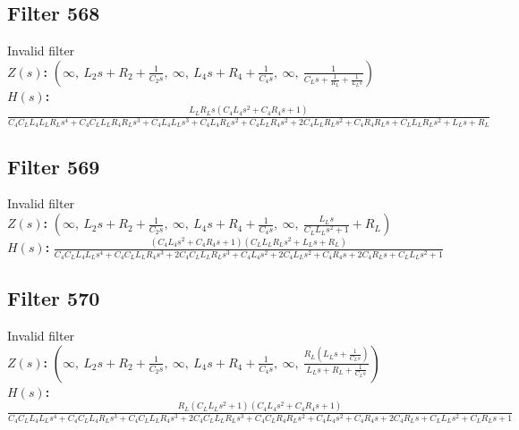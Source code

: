 \documentclass{article}
\begin{document}
\subsection*{Filter 568}
Invalid filter \\ 
\textbf{$Z(s)$:} $\left( \infty, \  L_{2} s + R_{2} + \frac{1}{C_{2} s}, \  \infty, \  L_{4} s + R_{4} + \frac{1}{C_{4} s}, \  \infty, \  \frac{1}{C_{L} s + \frac{1}{R_{L}} + \frac{1}{L_{L} s}}\right)$ \\ 
\textbf{$H(s)$:} $\frac{L_{L} R_{L} s \left(C_{4} L_{4} s^{2} + C_{4} R_{4} s + 1\right)}{C_{4} C_{L} L_{4} L_{L} R_{L} s^{4} + C_{4} C_{L} L_{L} R_{4} R_{L} s^{3} + C_{4} L_{4} L_{L} s^{3} + C_{4} L_{4} R_{L} s^{2} + C_{4} L_{L} R_{4} s^{2} + 2 C_{4} L_{L} R_{L} s^{2} + C_{4} R_{4} R_{L} s + C_{L} L_{L} R_{L} s^{2} + L_{L} s + R_{L}}$ \\ 
\subsection*{Filter 569}
Invalid filter \\ 
\textbf{$Z(s)$:} $\left( \infty, \  L_{2} s + R_{2} + \frac{1}{C_{2} s}, \  \infty, \  L_{4} s + R_{4} + \frac{1}{C_{4} s}, \  \infty, \  \frac{L_{L} s}{C_{L} L_{L} s^{2} + 1} + R_{L}\right)$ \\ 
\textbf{$H(s)$:} $\frac{\left(C_{4} L_{4} s^{2} + C_{4} R_{4} s + 1\right) \left(C_{L} L_{L} R_{L} s^{2} + L_{L} s + R_{L}\right)}{C_{4} C_{L} L_{4} L_{L} s^{4} + C_{4} C_{L} L_{L} R_{4} s^{3} + 2 C_{4} C_{L} L_{L} R_{L} s^{3} + C_{4} L_{4} s^{2} + 2 C_{4} L_{L} s^{2} + C_{4} R_{4} s + 2 C_{4} R_{L} s + C_{L} L_{L} s^{2} + 1}$ \\ 
\subsection*{Filter 570}
Invalid filter \\ 
\textbf{$Z(s)$:} $\left( \infty, \  L_{2} s + R_{2} + \frac{1}{C_{2} s}, \  \infty, \  L_{4} s + R_{4} + \frac{1}{C_{4} s}, \  \infty, \  \frac{R_{L} \left(L_{L} s + \frac{1}{C_{L} s}\right)}{L_{L} s + R_{L} + \frac{1}{C_{L} s}}\right)$ \\ 
\textbf{$H(s)$:} $\frac{R_{L} \left(C_{L} L_{L} s^{2} + 1\right) \left(C_{4} L_{4} s^{2} + C_{4} R_{4} s + 1\right)}{C_{4} C_{L} L_{4} L_{L} s^{4} + C_{4} C_{L} L_{4} R_{L} s^{3} + C_{4} C_{L} L_{L} R_{4} s^{3} + 2 C_{4} C_{L} L_{L} R_{L} s^{3} + C_{4} C_{L} R_{4} R_{L} s^{2} + C_{4} L_{4} s^{2} + C_{4} R_{4} s + 2 C_{4} R_{L} s + C_{L} L_{L} s^{2} + C_{L} R_{L} s + 1}$ \\ 
\end{document}
